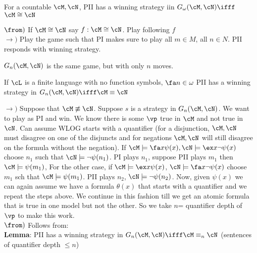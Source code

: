 \begin{theorem}
    For a countable $\cM, \cN$, PII has a winning strategy iin $G_{\omega}(\cM, \cN) \ifff$ $\cM \cong \cN$ 
\end{theorem}

\begin{pf}
    $\from)$ If $\cM \cong \cN$ say $f: \cM \cong \cN$. Play following $f$ \\
    $\to)$ Play the game such that PI makes sure to play all $m \in M$, all $n \in N$. PII responds with winning strategy. 
\end{pf}

\noindent
$G_n(\cM, \cN)$ is the same game, but with only $n$ moves. 

\begin{theorem}
    If $\cL$ is a finite language with no function symbols, $\fa n \in \omega$ PII has a winning strategy in $G_n(\cM, \cN) \ifff \cM \equiv \cN$ 
\end{theorem}

\begin{pf}
    $\to)$ Suppose that $\cM \not\equiv \cN$. Suppose $s$ is a strategy in $G_n(\cM, \cN)$. We want to play as PI and win. We know there is some $\vp$ true in $\cM$ and not true in $\cN$. Can assume WLOG starts with a quantifier (for a disjunction, $\cM, \cN$ must disagree on one of the disjuncts and for negations $\cM, \cN$ will still disagree on the formula without the negation). If $\cM \models \fa x \psi(x), \cN \models \ex x \neg \psi(x)$ choose $n_1$ such that $\cN \models \neg \psi(n_1)$. PI plays $n_1$, suppose PII plays $m_1$ then $\cM \models \psi(m_1)$, For the other case, if $\cM \models \ex x \psi(x)$, $\cN \models \fa x \neg \psi(x)$ choose $m_1$ sch that $\cM \models \psi(m_1)$. PII plays $n_2$, $\cN \models \neg \psi(n_2)$. Now, given $\psi(x)$ we can again assume we have a formula $\theta(x)$ that starts with a quantifier and we repeat the steps above. We continue in this fashion till we get an atomic formula that is true in one model but not the other. So we take $n$= quantifier depth of $\vp$ to make this work. \\
    $\from)$ Follows from: \\
    \textbf{Lemma}: PII has a winning strategy in $G_n(\cM, \cN) \ifff \cM \equiv_n \cN$ (sentences of quantifier depth $\le n$)
\end{pf}
